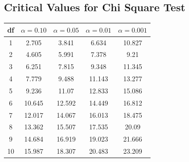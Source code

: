 \documentclass[a4paper,12pt]{article}
\begin{document}
\subsection*{Critical Values for Chi Square Test}
{
	\Large
	\begin{center}
		\begin{tabular}{|c|c|c|c|c|}
			\hline 
			df	&	$\alpha=0.10$	&	$\alpha=0.05$	&	$\alpha=0.01$	&	$\alpha=0.001$	\\ \hline
			1	& 	2.705	&	3.841	&	6.634	&	10.827	\\ \hline
			2	&	4.605	&	5.991	&	7.378	&	9.21	\\ \hline
			3	&	6.251	&	7.815	&	9.348	&	11.345	\\ \hline
			4	&	7.779	&	9.488	&	11.143	&	13.277	\\ \hline
			5	&	9.236	&	11.07	&	12.833	&	15.086	\\ \hline
			6	&	10.645	&	12.592	&	14.449	&	16.812	\\ \hline
			7	&	12.017	&	14.067	&	16.013	&	18.475	\\ \hline
			8	&	13.362	&	15.507	&	17.535	&	20.09	\\ \hline
			9	&	14.684	&	16.919	&	19.023	&	21.666	\\ \hline
			10	&	15.987	&	18.307	&	20.483	&	23.209	\\ \hline
		\end{tabular} 
	\end{center}
}
\end{document}
